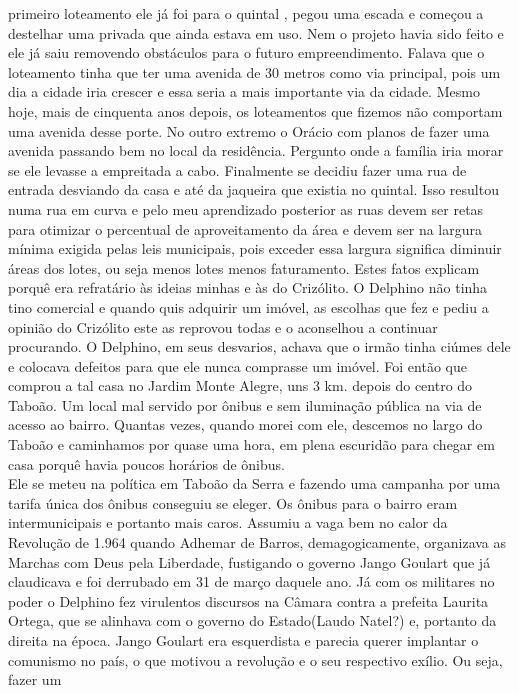 \documentclass[12pt,brazil,]{book}
\begin{document}
primeiro loteamento ele já foi para o quintal , pegou uma escada e
começou a destelhar uma privada que ainda estava em uso. Nem o projeto
havia sido feito e ele já saiu removendo obstáculos para o futuro
empreendimento. Falava que o loteamento tinha que ter uma avenida de 30
metros como via principal, pois um dia a cidade iria crescer e essa
seria a mais importante via da cidade. Mesmo hoje, mais de cinquenta
anos depois, os loteamentos que fizemos não comportam uma avenida desse
porte. No outro extremo o Orácio com planos de fazer uma avenida
passando bem no local da residência. Pergunto onde a família iria morar
se ele levasse a empreitada a cabo. Finalmente se decidiu fazer uma rua
de entrada desviando da casa e até da jaqueira que existia no quintal.
Isso resultou numa rua em curva e pelo meu aprendizado posterior as ruas
devem ser retas para otimizar o percentual de aproveitamento da área e
devem ser na largura mínima exigida pelas leis municipais, pois exceder
essa largura significa diminuir áreas dos lotes, ou seja menos lotes
menos faturamento. Estes fatos explicam porquê era refratário às ideias
minhas e às do Crizólito. O Delphino não tinha tino comercial e quando
quis adquirir um imóvel, as escolhas que fez e pediu a opinião do
Crizólito este as reprovou todas e o aconselhou a continuar procurando.
O Delphino, em seus desvarios, achava que o irmão tinha ciúmes dele e
colocava defeitos para que ele nunca comprasse um imóvel. Foi então que
comprou a tal casa no Jardim Monte Alegre, uns 3 km. depois do centro do
Taboão. Um local mal servido por ônibus e sem iluminação pública na via
de acesso ao bairro. Quantas vezes, quando morei com ele, descemos no
largo do Taboão e caminhamos por quase uma hora, em plena escuridão para
chegar em casa porquê havia poucos horários de ônibus.\\
Ele se meteu na política em Taboão da Serra e fazendo uma campanha por
uma tarifa única dos ônibus conseguiu se eleger. Os ônibus para o bairro
eram intermunicipais e portanto mais caros. Assumiu a vaga bem no calor
da Revolução de 1.964 quando Adhemar de Barros, demagogicamente,
organizava as Marchas com Deus pela Liberdade, fustigando o governo
Jango Goulart que já claudicava e foi derrubado em 31 de março daquele
ano. Já com os militares no poder o Delphino fez virulentos discursos na
Câmara contra a prefeita Laurita Ortega, que se alinhava com o governo
do Estado(Laudo Natel?) e, portanto da direita na época. Jango Goulart
era esquerdista e parecia querer implantar o comunismo no país, o que
motivou a revolução e o seu respectivo exílio. Ou seja, fazer um
\end{document}

